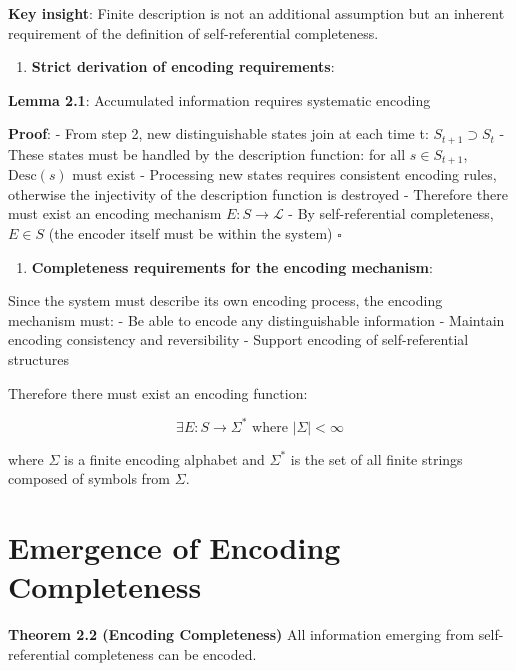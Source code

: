   \textbf{Key insight}: Finite description is not an additional assumption but an inherent requirement of the definition of self-referential completeness.

\begin{enumerate}
\item \textbf{Strict derivation of encoding requirements}:
\end{enumerate}
   \textbf{Lemma 2.1}: Accumulated information requires systematic encoding
\label{lem:2.1}
   
   \textbf{Proof}:
   - From step 2, new distinguishable states join at each time t: $S_{t+1} \supset S_t$
   - These states must be handled by the description function: for all $s \in S_{t+1}$, $\text{Desc}(s)$ must exist
   - Processing new states requires consistent encoding rules, otherwise the injectivity of the description function is destroyed
   - Therefore there must exist an encoding mechanism $E: S \to \mathcal{L}$
   - By self-referential completeness, $E \in S$ (the encoder itself must be within the system) $\square$

\begin{enumerate}
\item \textbf{Completeness requirements for the encoding mechanism}:
\end{enumerate}
   Since the system must describe its own encoding process, the encoding mechanism must:
   - Be able to encode any distinguishable information
   - Maintain encoding consistency and reversibility
   - Support encoding of self-referential structures

   Therefore there must exist an encoding function:
   
\begin{equation}
\exists E: S \rightarrow \Sigma^* \text{ where } |\Sigma| < \infty
\end{equation}
   
   where $\Sigma$ is a finite encoding alphabet and $\Sigma^*$ is the set of all finite strings composed of symbols from $\Sigma$.

\section{Emergence of Encoding Completeness}
\label{sec:ch02_encoding:emergence-of-encoding-completeness}

\textbf{Theorem 2.2 (Encoding Completeness)}
\label{thm:2.2}
All information emerging from self-referential completeness can be encoded.

